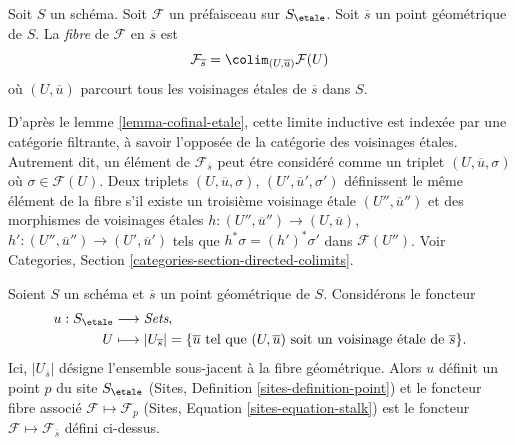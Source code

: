 \begin{definition}
\label{definition-stalk}
Soit $S$ un sch\'ema.
Soit $\mathcal{F}$ un pr\'efaisceau sur $S_\etale$.
Soit $\overline{s}$ un point g\'eom\'etrique de $S$.
La {\it fibre} de $\mathcal{F}$ en $\overline{s}$ est
$$
\mathcal{F}_{\overline{s}}
=
\colim_{(U, \overline{u})} \mathcal{F}(U)
$$
o\`u $(U, \overline{u})$ parcourt tous les voisinages
\'etales de $\overline{s}$ dans $S$.
\end{definition}

\noindent
D'apr\`es le lemme \ref{lemma-cofinal-etale}, cette limite inductive est index\'ee par une cat\'egorie
filtrante, \`a savoir l'oppos\'ee de la cat\'egorie des voisinages \'etales.
Autrement dit, un \'el\'ement de $\mathcal{F}_{\overline{s}}$ peut \'etre
consid\'er\'e comme un triplet $(U, \overline{u}, \sigma)$ o\`u
$\sigma \in \mathcal{F}(U)$. Deux triplets
$(U, \overline{u}, \sigma)$, $(U', \overline{u}', \sigma')$
d\'efinissent le m\^eme \'el\'ement de la fibre s'il existe un troisi\`eme
voisinage \'etale $(U'', \overline{u}'')$ et des morphismes de voisinages
\'etales $h : (U'', \overline{u}'') \to (U, \overline{u})$,
$h' : (U'', \overline{u}'') \to (U', \overline{u}')$ tels que
$h^*\sigma = (h')^*\sigma'$ dans $\mathcal{F}(U'')$. Voir
Categories, Section \ref{categories-section-directed-colimits}.

\begin{lemma}
\label{lemma-stalk-gives-point}
Soient $S$ un sch\'ema et $\overline{s}$ un point g\'eom\'etrique de $S$.
Consid\'erons le foncteur
\begin{align*}
u : S_\etale & \longrightarrow \textit{Sets}, \\
U & \longmapsto
|U_{\overline{s}}|
=
\{\overline{u} \text{ tel que }(U, \overline{u})
\text{ soit un voisinage \'etale de }\overline{s}\}.
\end{align*}
Ici, $|U_{\overline{s}}|$ d\'esigne l'ensemble sous-jacent \`a la fibre g\'eom\'etrique.
Alors $u$ d\'efinit un point $p$ du site $S_\etale$
(Sites, Definition \ref{sites-definition-point})
et le foncteur fibre associ\'e $\mathcal{F} \mapsto \mathcal{F}_p$
(Sites, Equation \ref{sites-equation-stalk})
est le foncteur $\mathcal{F} \mapsto \mathcal{F}_{\overline{s}}$
d\'efini ci-dessus.
\end{lemma}

